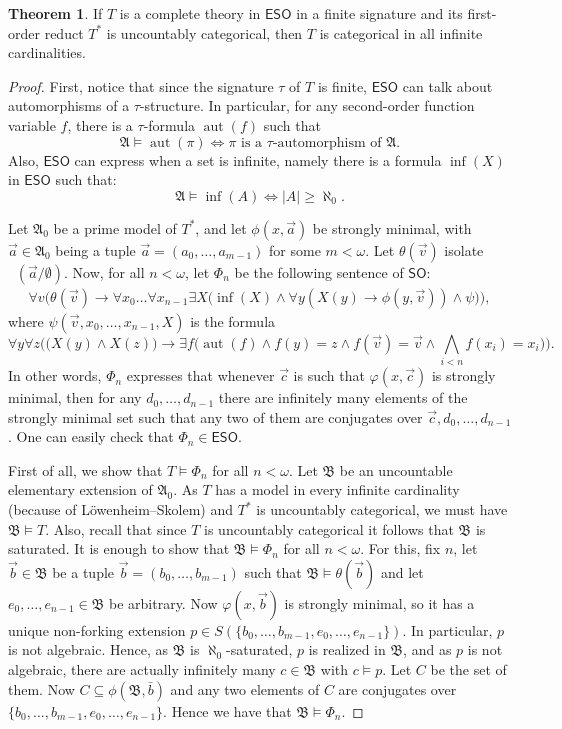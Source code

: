 \documentclass[a4paper]{amsart}
\theoremstyle{definition}
\newtheorem{theorem}[definition]{Theorem}
\theoremstyle{remark}
\newcommand{\A}{\mathcal{A}}
\newcommand{\B}{\mathcal{B}}
\DeclareMathOperator{\aut}{aut}
\newcommand\fol{\mathsf{FO}}
\newcommand\sol{\mathsf{SO}}
\newcommand\eso{\mathsf{ESO}}
\theoremstyle{definition}
\renewcommand{\A}{\mathfrak{A}}
\renewcommand{\B}{\mathfrak{B}}
\DeclareMathOperator{\foltype}{tp_\fol}
\begin{document}
\begin{theorem}\label{ESO categoricity transfer down to countable}
    If $T$ is a complete theory in $\eso$ in a finite signature and its first-order reduct $T^*$ is uncountably categorical, then $T$ is categorical in all infinite cardinalities.
\end{theorem}
\begin{proof}
    First, notice that since the signature $\tau$ of $T$ is finite, $\eso$ can talk about automorphisms of a $\tau$-structure. In particular, for any second-order function variable $f$, there is a $\tau$-formula $\aut(f)$ such that
    \[
        \A\models\aut(\pi) \iff \text{$\pi$ is a $\tau$-automorphism of $\A$}.
    \]
    Also, $\eso$ can express when a set is infinite, namely there is a formula $\inf(X)$ in $\eso$ such that:
    \[
        \A\models \inf(A) \iff  |A|\geq \aleph_0.
    \]
    
    Let $\A_0$ be a prime model of $T^*$, and let $\phi(x,\vec{a})$ be strongly minimal, with $\vec{a}\in\A_0$ being a tuple $\vec{a}=(a_0,\dots,a_{m-1})$ for some $m<\omega$. Let $\theta(\vec{v})$ isolate $\foltype(\vec{a}/\emptyset)$. Now, for all $n<\omega$, let $\Phi_n$ be the following sentence of $\sol$:
    \begin{gather*}
        \forall v\big(\theta(\vec{v})\to\forall x_0\dots\forall x_{n-1}\exists X\big(\inf(X)\land\forall y(X(y)\to\phi(y,\vec{v}))\land\psi\big) \big),
    \end{gather*}
    where $\psi(\vec{v},x_0,\dots,x_{n-1},X)$ is the formula
    \[
        \forall y\forall z\bigg(\big(X(y)\land X(z)\big)\to\exists f\bigg(\aut(f) \land f(y) = z \land f(\vec{v}) = \vec{v} \land \bigwedge_{i<n}f(x_i) = x_i\bigg)\bigg).
    \]
    In other words, $\Phi_n$ expresses that whenever $\vec{c}$ is such that $\varphi(x,\vec{c})$ is strongly minimal, then for any $d_0,\dots,d_{n-1}$ there are infinitely many elements of the strongly minimal set such that any two of them are conjugates over $\vec{c},d_0,\dots,d_{n-1}$. One can easily check that $\Phi_n\in\eso$.

    First of all, we show that $T\models\Phi_n$ for all $n<\omega$. Let $\B$ be an uncountable elementary extension of $\A_0$. As $T$ has a model in every infinite cardinality (because of Löwenheim--Skolem) and $T^*$ is uncountably categorical, we must have $\B\models T$. Also, recall that since $T$ is uncountably categorical it follows that $\B$ is saturated. It is enough to show that $\B\models\Phi_n$ for all $n<\omega$. For this, fix $n$, let $\vec{b}\in\B$ be a tuple $\vec{b}=(b_0,\dots,b_{m-1})$ such that $\B\models\theta(\vec{b})$ and let $e_0,\dots,e_{n-1}\in\B$ be arbitrary. Now $\varphi(x,\vec{b})$ is strongly minimal, so it has a unique non-forking extension $p\in S(\{b_0,\dots,b_{m-1},e_0,\dots,e_{n-1}\})$. In particular, $p$ is not algebraic. Hence, as $\B$ is $\aleph_0$-saturated, $p$ is realized in $\B$, and as $p$ is not algebraic, there are actually infinitely many $c\in\B$ with $c\models p$. Let $C$ be the set of them. Now $C\subseteq\phi(\B,\bar{b})$ and any two elements of $C$ are conjugates over $\{b_0,\dots,b_{m-1},e_0,\dots,e_{n-1}\}$. Hence we have that $\B\models\Phi_n$.


\end{proof}
\end{document}
